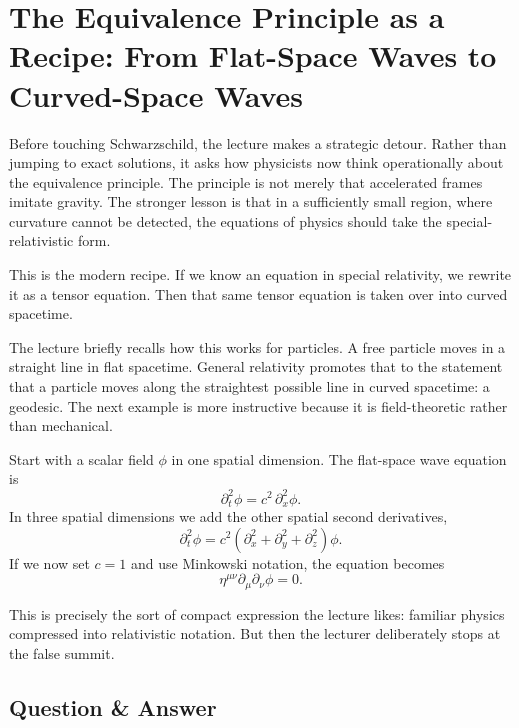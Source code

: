 \section{The Equivalence Principle as a Recipe: From Flat-Space Waves to Curved-Space Waves}

Before touching Schwarzschild, the lecture makes a strategic detour. Rather than jumping to exact solutions, it asks how physicists now think operationally about the equivalence principle. The principle is not merely that accelerated frames imitate gravity. The stronger lesson is that in a sufficiently small region, where curvature cannot be detected, the equations of physics should take the special-relativistic form.

This is the modern recipe. If we know an equation in special relativity, we rewrite it as a tensor equation. Then that same tensor equation is taken over into curved spacetime.

The lecture briefly recalls how this works for particles. A free particle moves in a straight line in flat spacetime. General relativity promotes that to the statement that a particle moves along the straightest possible line in curved spacetime: a geodesic. The next example is more instructive because it is field-theoretic rather than mechanical.

Start with a scalar field \(\phi\) in one spatial dimension. The flat-space wave equation is
\begin{equation}
\partial_t^2\phi=c^2\,\partial_x^2\phi.
\end{equation}
In three spatial dimensions we add the other spatial second derivatives,
\begin{equation}
\partial_t^2\phi
=
c^2\left(\partial_x^2+\partial_y^2+\partial_z^2\right)\phi.
\end{equation}
If we now set \(c=1\) and use Minkowski notation, the equation becomes
\begin{equation}
\eta^{\mu\nu}\partial_\mu\partial_\nu\phi=0.
\end{equation}

This is precisely the sort of compact expression the lecture likes: familiar physics compressed into relativistic notation. But then the lecturer deliberately stops at the false summit.

\subsection{Question \& Answer}

